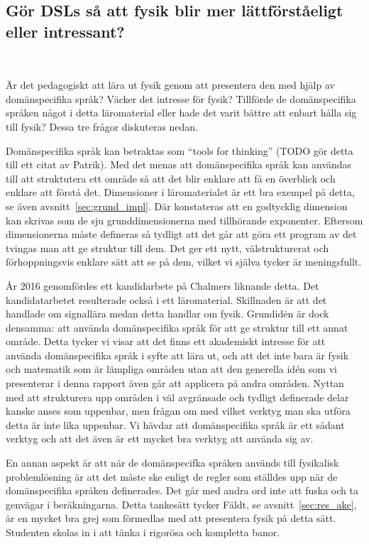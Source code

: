 \begin{draft}
\subsection{Gör DSLs så att fysik blir mer lättförståeligt eller
intressant?}~\label{sec:bara_fysik}

Är det pedagogiskt att lära ut fysik genom att presentera den med hjälp av
domänspecifika språk? Väcker det intresse för fysik? Tillförde de domänspecifika
språken något i detta läromaterial eller hade det varit bättre att enbart hålla
sig till fysik? Dessa tre frågor diskuteras nedan.

Domänspecifika språk kan betraktas som ``tools for thinking'' (TODO gör detta
till ett citat av Patrik). Med det menas att domänspecifika språk kan användas
till att struktutera ett område så att det blir enklare att få en överblick och
enklare att förstå det. Dimensioner i läromaterialet är ett bra exempel på
detta, se även avsnitt~\ref{sec:grund_impl}. Där konstateras att en godtycklig
dimension kan skrivas som de sju grunddimensionerna med tillhörande exponenter.
Eftersom dimensionerna måste defineras så tydligt att det går att göra ett
program av det tvingas man att ge struktur till dem. Det ger ett nytt,
välstrukturerat och förhoppningsvis enklare sätt att se på dem, vilket vi själva
tycker är meningsfullt.

År 2016 genomfördes ett kandidarbete på Chalmers liknande detta. \cite{kandidat2016}
Det kandidatarbetet resulterade också i ett läromaterial. Skillnaden är att det
handlade om signallära medan detta handlar om fysik. Grundidėn är dock densamma:
att använda domänspecifika språk för att ge struktur till ett annat område.
Detta tycker vi visar att det finns ett akademiskt intresse för att använda
domänspecifika språk i syfte att lära ut, och att det inte bara är fysik och
matematik som är lämpliga områden utan att den generella idén som vi presenterar
i denna rapport även går att applicera på andra områden. Nyttan med att
strukturera upp områden i väl avgränsade och tydligt definerade delar kanske
anses som uppenbar, men frågan om med vilket verktyg man ska utföra detta är
inte lika uppenbar. Vi hävdar att domänspecifika språk är ett sådant verktyg och
att det även är ett mycket bra verktyg att använda sig av.

En annan aspekt är att när de domänspecifka språken används till fysikalisk
problemlösning är att det måste ske enligt de regler som ställdes upp när de
domänspecifika språken definerades. Det går med andra ord inte att fuska och ta
genvägar i beräkningarna. Detta tankesätt tycker Fäldt, se
avsnitt~\ref{sec:res_ake}, är en mycket bra grej som förmedlas med att
presentera fysik på detta sätt. Studenten skolas in i att tänka i rigorösa och
kompletta banor.


\end{draft}
